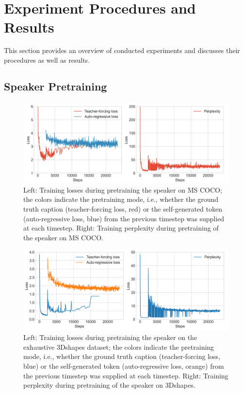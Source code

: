 \section{Experiment Procedures and Results}


This section provides an overview of conducted experiments and discusses their procedures as well as results. 

\subsection{Speaker Pretraining}
\label{speaker_pretraining}
\begin{figure}[h]
	\centering
	\includegraphics[width=\linewidth]{images/coco_pretraining_losses_ppls.png}
	\caption{Left: Training losses during pretraining the speaker on MS COCO; the colors indicate the pretraining mode, i.e., whether the ground truth caption (teacher-forcing loss, red) or the self-generated token (auto-regressive loss, blue) from the previous timestep was supplied at each timestep. Right: Training perplexity during pretraining of the speaker on MS COCO.}
	\label{fig:coco_pretraining}
\end{figure}  

\begin{figure}[h]
	\centering
	\includegraphics[width=\linewidth]{images/3dshapes_pretraining_losses_ppls.png}
	\caption{Left: Training losses during pretraining the speaker on the exhaustive 3Dshapes dataset; the colors indicate the pretraining mode, i.e., whether the ground truth caption (teacher-forcing loss, blue) or the self-generated token (auto-regressive loss, orange) from the previous timestep was supplied at each timestep. Right: Training perplexity during pretraining of the speaker on 3Dshapes.}
	\label{fig:3dshapes_pretraining}
\end{figure}  

